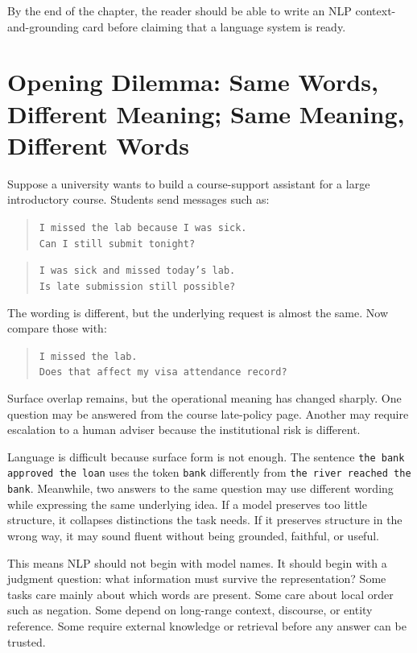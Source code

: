 By the end of the chapter, the reader should be able to write an NLP context-and-grounding card before claiming that a language system is ready.

\section{Opening Dilemma: Same Words, Different Meaning; Same Meaning, Different Words}

Suppose a university wants to build a course-support assistant for a large introductory course. Students send messages such as:
\begin{quote}
\texttt{I missed the lab because I was sick.}\\
\texttt{Can I still submit tonight?}
\end{quote}
\begin{quote}
\texttt{I was sick and missed today's lab.\\ Is late submission still possible?}
\end{quote}
The wording is different, but the underlying request is almost the same. Now compare those with:
\begin{quote}
\texttt{I missed the lab.}\\
\texttt{Does that affect my visa attendance record?}
\end{quote}
Surface overlap remains, but the operational meaning has changed sharply. One question may be answered from the course late-policy page. Another may require escalation to a human adviser because the institutional risk is different.

Language is difficult because surface form is not enough. The sentence \texttt{the bank approved the loan} uses the token \texttt{bank} differently from \texttt{the river reached the bank}. Meanwhile, two answers to the same question may use different wording while expressing the same underlying idea. If a model preserves too little structure, it collapses distinctions the task needs. If it preserves structure in the wrong way, it may sound fluent without being grounded, faithful, or useful.

This means NLP should not begin with model names. It should begin with a judgment question: what information must survive the representation? Some tasks care mainly about which words are present. Some care about local order such as negation. Some depend on long-range context, discourse, or entity reference. Some require external knowledge or retrieval before any answer can be trusted.

